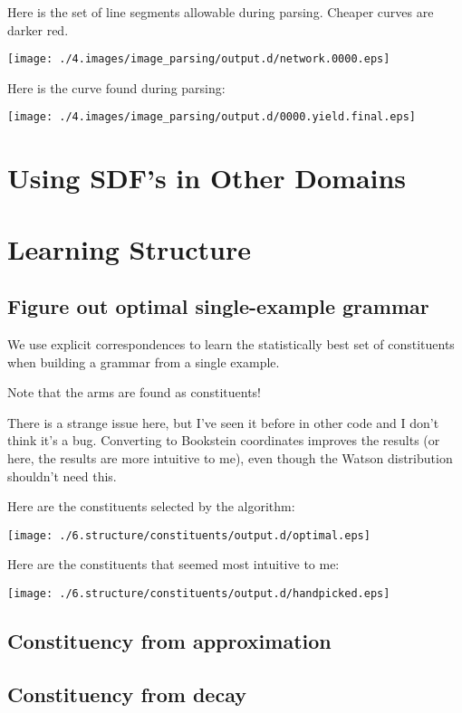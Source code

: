 \documentclass{book}
\begin{document}
Here is the set of line segments allowable during parsing. Cheaper
curves are darker red.

\texttt{[image: ./4.images/image\_parsing/output.d/network.0000.eps]}

Here is the curve found during parsing:

\texttt{[image: ./4.images/image\_parsing/output.d/0000.yield.final.eps]}
\section{Using SDF's in Other Domains}
\label{sec-3_6}
\section{Learning Structure}
\label{sec-3_7}
\subsection{Figure out optimal single-example grammar}
\label{sec-3_7_1}


We use explicit correspondences to learn the statistically best set of
constituents when building a grammar from a single example.

Note that the arms are found as constituents!

There is a strange issue here, but I've seen it before in other code
and I don't think it's a bug. Converting to Bookstein coordinates
improves the results (or here, the results are more intuitive to me),
even though the Watson distribution shouldn't need this.

Here are the constituents selected by the algorithm:

\texttt{[image: ./6.structure/constituents/output.d/optimal.eps]}

Here are the constituents that seemed most intuitive to me:

\texttt{[image: ./6.structure/constituents/output.d/handpicked.eps]}
\subsection{Constituency from approximation}
\label{sec-3_7_2}
\subsection{Constituency from decay}
\label{sec-3_7_3}
\end{document}
